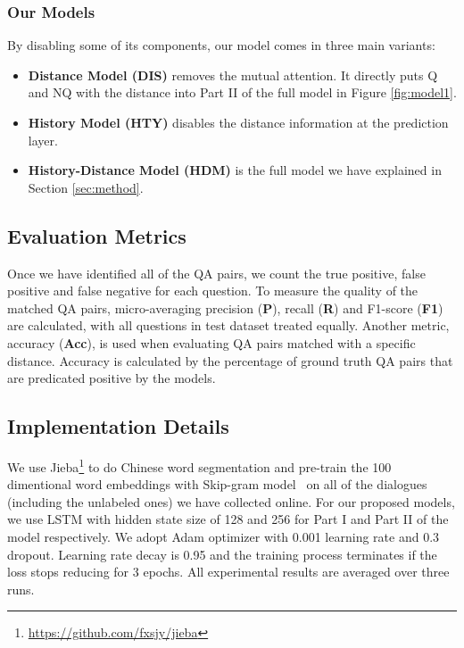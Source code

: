 \subsubsection{Our Models}
By disabling some of its components, our model comes in three main
variants:
\begin{itemize}

    \item \textbf{Distance Model (DIS)} removes the mutual attention. It directly puts Q and NQ with the distance into Part II of the full model in Figure \ref{fig:model1}.
    \item \textbf{History Model (HTY)} disables the distance information at the prediction layer.
    \item \textbf{History-Distance Model (HDM)} is the full model we have explained in Section \ref{sec:method}.
\end{itemize}


\subsection{Evaluation Metrics}

Once we have identified all of the QA pairs, we count the true positive, 
false positive and false negative for each question. 
To measure the quality of the matched QA pairs, micro-averaging 
precision (\textbf{P}), recall (\textbf{R}) and F1-score (\textbf{F1}) are 
calculated,  with all questions in test dataset treated equally. 
Another metric, accuracy (\textbf{Acc}), is used when evaluating QA pairs matched
with a specific distance. Accuracy is calculated by the percentage of ground
truth QA pairs that are predicated positive by the models.

\subsection{Implementation Details}
 
We use Jieba\footnote{\url{https://github.com/fxsjy/jieba}} to do Chinese word segmentation and pre-train the 100 dimentional word embeddings with Skip-gram model~\cite{mikolov2013efficient} on all of the dialogues (including the unlabeled ones) we have collected online. For our proposed models, we use LSTM with hidden state size of 128 and 256 for Part I and Part II of the model respectively. We adopt Adam optimizer with 0.001 learning rate and 0.3 dropout. 
Learning rate decay is 0.95 and the training process terminates if the 
loss stops reducing for 3 epochs. All experimental results are 
averaged over three runs.
